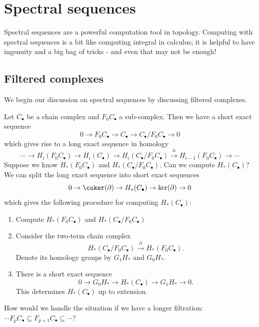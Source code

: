 \documentclass[ma3408.tex]{subfiles}
\begin{document}
\chapter{Spectral sequences}
Spectral sequences are a powerful computation tool in topology. Computing with spectral sequences is a bit like computing integral in calculus; it is helpful to have ingenuity and a big bag of tricks - and even that may not be enough! 
\section{Filtered complexes}
We begin our discussion on spectral sequences by discussing filtered complexes. 
\begin{Rem}
Let $C_{\bullet}$ be a chain complex and $F_0C_{\bullet}$ a sub-complex. Then we have a short exact sequence 
\[
0 \to F_0C_{\bullet} \to C_{\bullet} \to C_{\bullet}/F_0C_{\bullet} \to 0
\]
which gives rise to a long exact sequence in homology 
\[
\cdots \to H_i(F_0C_{\bullet}) \to H_i(C_{\bullet}) \to H_i(C_{\bullet}/F_0C_{\bullet}) \xrightarrow{\partial} H_{i-1}(F_0C_{\bullet}) \to \cdots
\]
Suppose we know $H_*(F_0C_{\bullet})$ and $H_*(C_{\bullet}/F_0C_{\bullet})$. Can we compute $H_*(C_{\bullet})$? We can split the long exact sequence into short exact sequences 
\[
0 \to \coker(\partial) \to H_*(C_{\bullet}) \to \ker(\partial) \to 0 
\]
which gives the following procedure for computing $H_*(C_{\bullet})$:
\begin{enumerate}
	\item Compute $H_*(F_0C_{\bullet})$ and $H_*(C_{\bullet}/F_0C_{\bullet})$
	\item Consider the two-term chain complex
\[
H_*(C_{\bullet}/F_0C_{\bullet}) \xrightarrow{\partial} H_*(F_0C_{\bullet}).
\]
Denote its homology groups by $G_1H_*$ and $G_0H_*$. 
\item
There is a short exact sequence
\[
0 \to G_0H_* \to H_*(C_{\bullet}) \to G_1H_* \to 0. 
\]
This determines $H_*(C_{\bullet})$ up to extension.
\end{enumerate}
How would we handle the situation if we have a longer filtration: $\cdots F_pC_{\bullet} \subseteq F_{p+1}C_{\bullet} \subseteq \cdots$?


\end{Rem}
\end{document}
